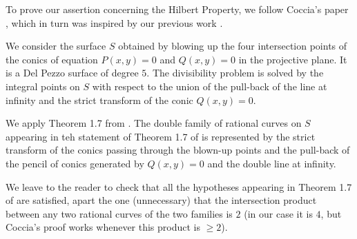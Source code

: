 \documentclass[leqno,12pt]{article} %
\theoremstyle{plain} %
\theoremstyle{definition} %
\begin{document}
 To prove our assertion concerning the Hilbert Property, we follow Coccia's paper \cite{Coccia}, which in turn was inspired by our previous work \cite{CZhilb}.
 
We consider the surface $S$ obtained by blowing up the four intersection points of the conics of equation $P(x,y)=0$ and $Q(x,y)=0$ in the projective plane. It is a Del Pezzo surface of degree $5$. The divisibility problem is solved by the integral points on $S$ with respect to the union of the pull-back of the line at infinity and the  strict transform of the conic $Q(x,y)=0$. 

 We apply  Theorem 1.7 from \cite{Coccia}. The double family of rational curves on $S$ appearing in teh statement of Theorem 1.7 of \cite{Coccia} is represented  by the strict transform of the conics passing through the blown-up points and the pull-back of the pencil  of conics generated by $Q(x,y)=0$ and the double line at infinity. 
 
 We  leave to the reader to check that all the hypotheses appearing in Theorem 1.7 of \cite{Coccia} are satisfied, apart the one (unnecessary) that the intersection product between any two rational curves of the two families is $2$ (in our case it is $4$, but Coccia's proof works whenever this product is $\geq 2$). 
 
 \bigskip
 
\end{document}

